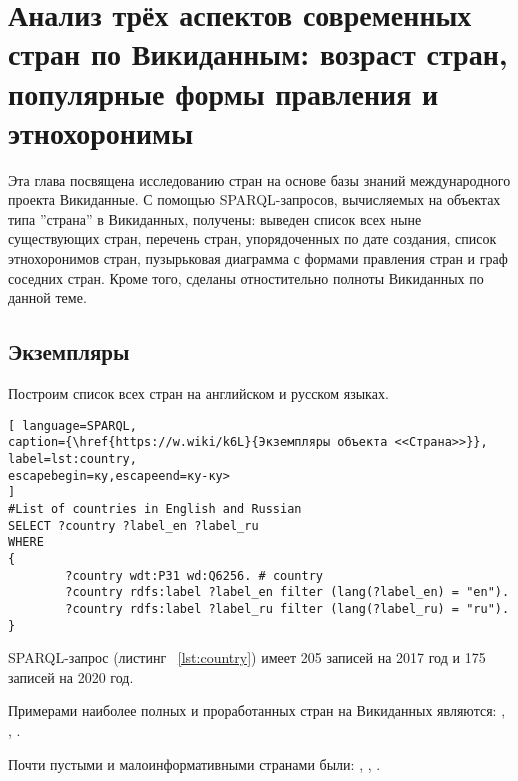 \chapter{Анализ трёх аспектов современных стран по Викиданным: возраст стран, популярные формы правления и этнохоронимы}
\label{ch:country}

Эта глава посвящена исследованию стран на основе базы знаний международного проекта Викиданные. С помощью SPARQL-запросов, вычисляемых на объектах типа ”страна” в Викиданных, получены: выведен список всех ныне существующих стран, перечень стран, упорядоченных по дате создания, список этнохоронимов стран, пузырьковая диаграмма с формами правления стран и граф соседних стран. Кроме того, сделаны отностительно полноты Викиданных по данной теме.
\section{Экземпляры}


Построим список всех стран на английском и русском языках.

\begin{lstlisting}[ language=SPARQL, 
caption={\href{https://w.wiki/k6L}{Экземпляры объекта <<Страна>>}},
label=lst:country, 
escapebegin=ку,escapeend=ку-ку>
]
#List of countries in English and Russian
SELECT ?country ?label_en ?label_ru
WHERE
{
		?country wdt:P31 wd:Q6256. # country
		?country rdfs:label ?label_en filter (lang(?label_en) = "en").
		?country rdfs:label ?label_ru filter (lang(?label_ru) = "ru").
}
\end{lstlisting}

SPARQL-запрос (листинг ~\ref{lst:country}) имеет 205 записей на 2017 год и 175 записей на 2020 год.

Примерами наиболее полных и проработанных стран на Викиданных являются:  , , .

Почти пустыми и малоинформативными странами были: , , .

